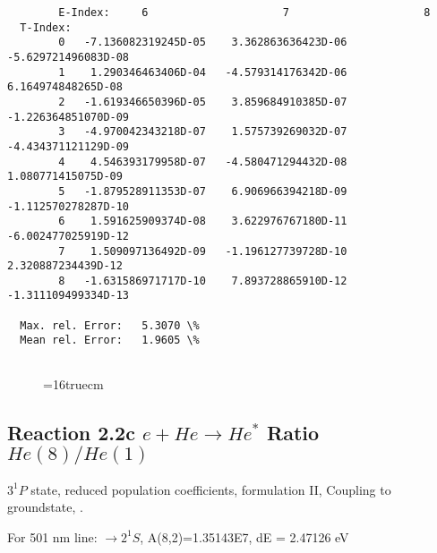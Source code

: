 \documentclass[12pt,dvipdfmx]{article}
\begin{document}
\begin{small}
\begin{verbatim}
        E-Index:     6                     7                     8
  T-Index:
        0   -7.136082319245D-05    3.362863636423D-06   -5.629721496083D-08
        1    1.290346463406D-04   -4.579314176342D-06    6.164974848265D-08
        2   -1.619346650396D-05    3.859684910385D-07   -1.226364851070D-09
        3   -4.970042343218D-07    1.575739269032D-07   -4.434371121129D-09
        4    4.546393179958D-07   -4.580471294432D-08    1.080771415075D-09
        5   -1.879528911353D-07    6.906966394218D-09   -1.112570278287D-10
        6    1.591625909374D-08    3.622976767180D-11   -6.002477025919D-12
        7    1.509097136492D-09   -1.196127739728D-10    2.320887234439D-12
        8   -1.631586971717D-10    7.893728865910D-12   -1.311109499334D-13

  Max. rel. Error:   5.3070 \%
  Mean rel. Error:   1.9605 \%


\end{verbatim}\end{small}
\begin{figure} \label{2.2b}
\epsfxsize=16truecm
\end{figure}
\newpage


\subsection{
  Reaction 2.2c $e + He \rightarrow He^*  $ Ratio $He(8)/He(1)$
}

  $3^1P$ state,
  reduced population coefficients, formulation II,
  Coupling to groundstate, \cite{kn:Fujimoto}.

  For 501 nm line: $\rightarrow 2^1S$, A(8,2)=1.35143E7, dE = 2.47126 eV
\end{document}
